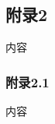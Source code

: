 \documentclass[12pt, a4paper, oneside]{ctexart}
\begin{document}
\begin{appendices}
	
	\subsection{附录2}
	内容
	\subsubsection{附录2.1}
	内容
\end{appendices}
\end{document}
